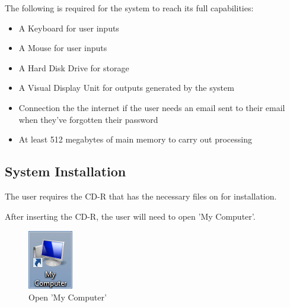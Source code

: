 The following is required for the system to reach its full capabilities:

\begin{itemize}
    \item A Keyboard for user inputs
    \item A Mouse for user inputs
    \item A Hard Disk Drive for storage
    \item A Visual Display Unit for outputs generated by the system
    \item Connection the the internet if the user needs an email sent to their email when they've forgotten their password
    \item At least 512 megabytes of main memory to carry out processing
\end{itemize}


\subsection{System Installation}

The user requires the CD-R that has the necessary files on for installation. 


After inserting the CD-R, the user will need to open 'My Computer'.

\begin{figure}[H]
    \includegraphics[width=\textwidth]{./Manual/Installation/MyComputer.png}
    \caption{Open 'My Computer'}
\end{figure}

